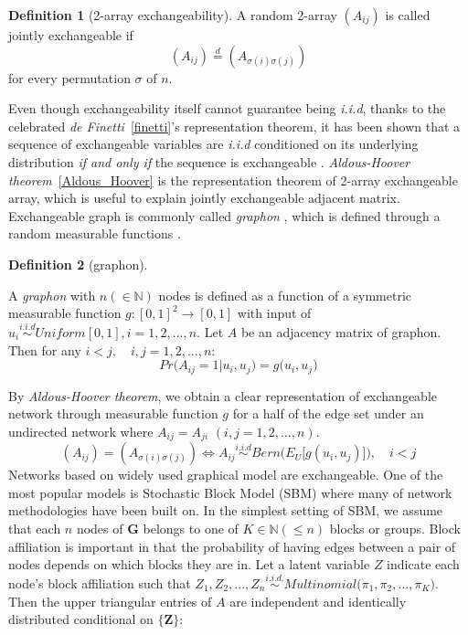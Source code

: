 \documentclass[12pt]{article}
\theoremstyle{definition}
\newtheorem{definition}{Definition}[section]
\begin{document}
\begin{definition}[2-array exchangeability]
	\label{exchangeability}
	A random 2-array $(A_{ij})$ is called jointly exchangeable if 
	$$(A_{ij}) \stackrel{d}{=} (A_{\sigma(i) \sigma(j)})$$
	for every permutation $\sigma$ of $n$.
\end{definition}
Even though exchangeability itself cannot guarantee being \textit{i.i.d}, thanks to the celebrated  \textit{de Finetti}~\ref{finetti}'s representation theorem, it has been shown that a sequence of exchangeable variables are \textit{i.i.d} conditioned on its underlying distribution \textit{if and only if} the sequence is exchangeable \citep{orbanz2015bayesian, caron2014sparse}. \textit{Aldous-Hoover theorem}~\ref{Aldous_Hoover} is the representation theorem of 2-array exchangeable array, which is useful to explain jointly exchangeable adjacent matrix. Exchangeable graph is commonly called \textit{graphon} \citep{lovasz2006limits}, which is defined through a random measurable functions \citep{chan2013estimation}.	
\begin{definition}[graphon]
	\label{graphon}
		
	A \textit{graphon} with $n (\in \mathbb{N})$ nodes is defined as a function of a symmetric measurable function $g : [0,1]^2 \rightarrow [0,1]$ with input of $u_{i} \overset{i.i.d}{\sim} Uniform[0,1], i = 1,2,... ,n$. 
	Let $A$ be an adjacency matrix of graphon. Then for any $i < j, \quad i,j=1,2,...,n$:	
\begin{equation}
	Pr \big(   A_{ij} = 1 \big| u_{i}, u_{j} \big) = g \big(  u_{i}, u_{j} \big)
\end{equation}
\end{definition}
By \textit{Aldous-Hoover theorem}, we obtain a clear representation of exchangeable network through measurable function $g$ for a half of the edge set under an undirected network where $A_{ij} = A_{ji}$  $(i,j=1,2,... , n)$. 	
\begin{equation}
( A_{ij} )  =  (   A_{\sigma(i) \sigma(j)}  ) \Longleftrightarrow A_{ij} \overset{i.i.d}{\sim} Bern\big( E_{U} \big[  g(u_{i}, u_{j})   \big] \big),  \quad i < j
\end{equation}  	
Networks based on  widely used graphical model are exchangeable. One of the most popular models is Stochastic Block Model (SBM) \citep{holland1983stochastic} where many of network methodologies have been built on. In the simplest setting of SBM, we assume that each $n$ nodes of $\mathbf{G}$ belongs to one of $K \in \mathbb{N} (\leq n)$ blocks or groups. Block affiliation is important in that the probability of having edges between a pair of nodes depends on which blocks they are in.  Let a latent variable $Z$ indicate each node's block affiliation such that $Z_{1}, Z_{2}, ... , Z_{n} \overset{i.i.d.}{\sim} Multinomial\big( \pi_{1}, \pi_{2}, ... , \pi_{K} \big)$. Then the upper triangular entries of $A$ are independent and identically distributed conditional on $\{\mathbf{Z}\}$:
\end{document}
